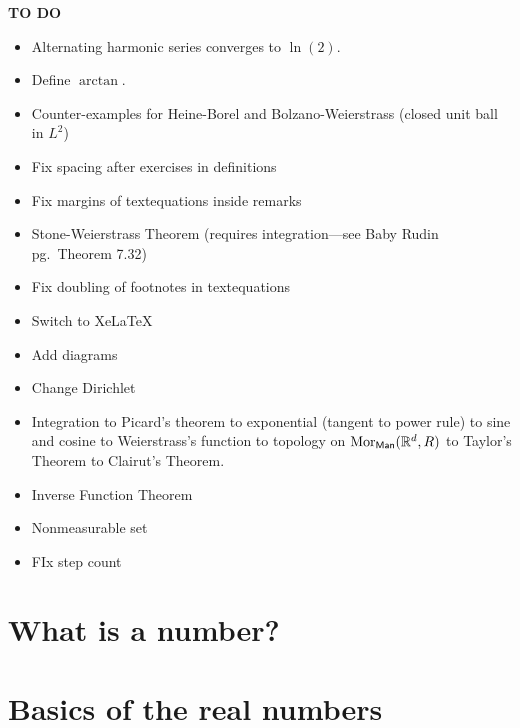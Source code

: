 \documentclass[11pt,fleqn]{book} %
\begin{document}
\textbf{TO DO}
\begin{itemize}
\item Alternating harmonic series converges to $\ln (2)$.

\item Define $\arctan$.

\item Counter-examples for Heine-Borel and Bolzano-Weierstrass (closed unit ball in $L^2$)

\item Fix spacing after exercises in definitions

\item Fix margins of textequations inside remarks

\item Stone-Weierstrass Theorem (requires integration---see Baby Rudin pg.~Theorem 7.32)

\item Fix doubling of footnotes in textequations

\item Switch to XeLaTeX

\item Add diagrams

\item Change Dirichlet

\item Integration to Picard's theorem to exponential (tangent to power rule) to sine and cosine to Weierstrass's function to topology on $\operatorname{Mor} _{\mathsf{Man}}(\mathbb{R} ^d,
R )$ to Taylor's Theorem to Clairut's Theorem.

\item Inverse Function Theorem

\item Nonmeasurable set

\item FIx step count
\end{itemize}



\chapter{What is a number?}\label{chp1}




\chapter{Basics of the real numbers}


\end{document}
